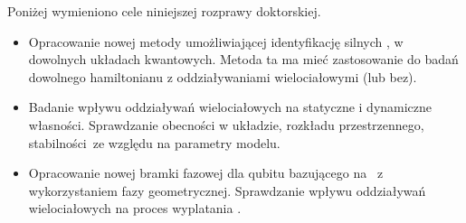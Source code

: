 Poniżej wymieniono cele niniejszej rozprawy doktorskiej.
\begin{itemize}


    \item Opracowanie nowej metody umożliwiającej identyfikację silnych \MZM, w dowolnych układach kwantowych.
    Metoda ta ma mieć zastosowanie do badań dowolnego hamiltonianu z oddziaływaniami wielociałowymi (lub bez).
    
    \item Badanie wpływu oddziaływań wielociałowych na statyczne i dynamiczne własności\linebreak \MZM.
    Sprawdzanie  obecności w układzie, rozkładu przestrzennego, stabilności\linebreak \MZM\ ze względu na parametry modelu.
    
    \item Opracowanie nowej bramki fazowej dla qubitu bazującego na \MZM\ z wykorzystaniem fazy geometrycznej.
    Sprawdzanie wpływu oddziaływań wielociałowych na proces wyplatania \MZM.
\end{itemize}

\ornament